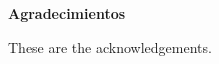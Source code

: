\newenvironment{acknowledgements}%
    {\cleardoublepage\thispagestyle{empty}\null\vfill\begin{center}%
    \bfseries Agradecimientos\end{center}}%
    {\vfill\null}
        \begin{acknowledgements}
        These are the acknowledgements.
        \end{acknowledgements}